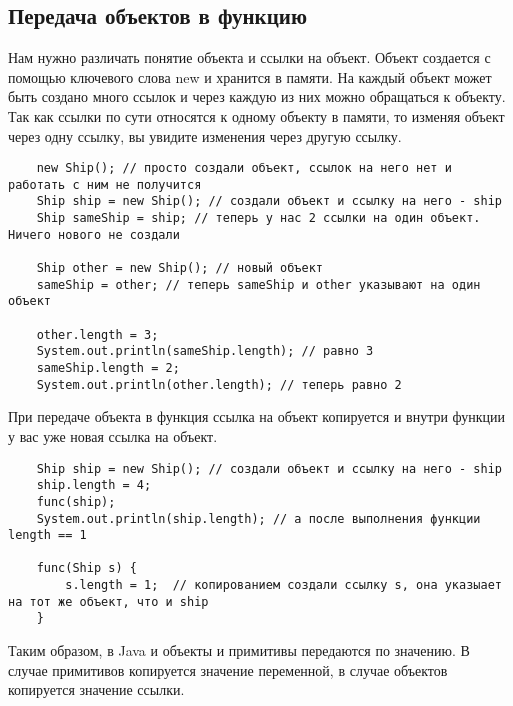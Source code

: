 \subsection*{Передача объектов в функцию}
Нам нужно различать понятие объекта и ссылки на объект. Объект создается с помощью ключевого слова new и хранится в памяти. На каждый объект может быть создано много ссылок и через каждую из них можно обращаться к объекту. Так как ссылки по сути относятся к одному объекту в памяти, то изменяя объект через одну ссылку, вы увидите изменения через другую ссылку.

\begin{lstlisting}
	new Ship(); // просто создали объект, ссылок на него нет и работать с ним не получится
	Ship ship = new Ship(); // создали объект и ссылку на него - ship
	Ship sameShip = ship; // теперь у нас 2 ссылки на один объект. Ничего нового не создали

	Ship other = new Ship(); // новый объект
	sameShip = other; // теперь sameShip и other указывают на один объект

	other.length = 3;
	System.out.println(sameShip.length); // равно 3
	sameShip.length = 2;
	System.out.println(other.length); // теперь равно 2

\end{lstlisting}

При передаче объекта в функция ссылка на объект копируется и внутри функции у вас уже новая ссылка на объект. 

\begin{lstlisting}
	Ship ship = new Ship(); // создали объект и ссылку на него - ship
	ship.length = 4;
	func(ship);
	System.out.println(ship.length); // а после выполнения функции length == 1
	
	func(Ship s) {
		s.length = 1;  // копированием создали ссылку s, она указыает на тот же объект, что и ship
	}
\end{lstlisting}

Таким образом, в Java и объекты и примитивы передаются по значению. В случае примитивов копируется значение переменной, в случае объектов копируется значение ссылки.

